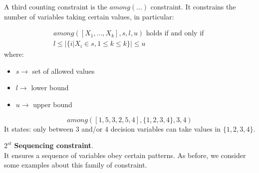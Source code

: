 A third counting constraint is the $\textit{among}(\dots)$ constraint. It constrains the number of variables taking certain values, in particular:
\begin{definition}[title = $\textit{among}(\dots)$]
    $$
        \begin{gathered}
            \textit{among}([X_1, \dots, X_k], s, l, u) \text{ holds if and only if } \\
            l \leq |\{i | X_i \in s, 1 \leq k \leq k\}| \leq u
        \end{gathered}
    $$
    where:
    \begin{itemize}
        \renewcommand{\labelitemi}{-}
        \item $s \rightarrow$ set of allowed values
        \item $l \rightarrow$ lower bound
        \item $u \rightarrow$ upper bound
    \end{itemize}
\end{definition}
\begin{example}
    $$ \textit{among}([1, 5, 3, 2, 5, 4], \{1, 2, 3, 4\}, 3, 4) $$
    It states: only between $3$ and/or $4$ decision variables can take values in $\{1, 2, 3, 4\}$.
\end{example}
$2^{st}$ \textbf{Sequencing constraint}. \\
It ensures a sequence of variables obey certain patterns. As before, we consider some examples about this family of constraint. \vspace{7pt}

